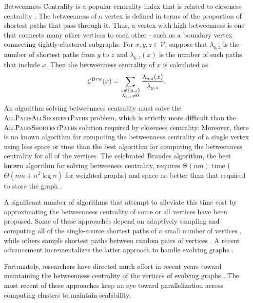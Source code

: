 \documentclass[10]{report}
\newcommand{\algoname}[1]{\textnormal{\textsc{#1}}}
\begin{document}
Betweenness Centrality is a popular centrality index that is related to closeness centrality \cite{freeman1977set}. 
The betweenness of a vertex is defined in terms of the proportion of shortest paths that pass through it.
Thus, a vertex with high betweenness is one that connects many other vertices to each other - such as a boundary vertex connecting tightly-clustered subgraphs.
For $x,y, z \in \mathcal{V}$, suppose that $\lambda_{y,z}$ is the number of shortest paths from $y$ to $z$ and $\lambda_{y,z}(x)$ is the number of such paths that include $x$. 
Then the betweenness centrality of $x$ is calculated as
%
\begin{equation} \label{eq:bc}
\mathcal{C}^{\algoname{Btw}}(x) = \sum\limits_{\substack{x \not\in \{y,z\} \\ \lambda_{y,z} \neq 0}} \frac{\lambda_{y,z}(x)}{\lambda_{y,z}}.
\end{equation}
%
An algorithm solving betweenness centrality must solve the \algoname{AllPairsAllShortestPaths} problem, which is strictly more difficult than the \algoname{AllPairsShortestPaths} solution required by closeness centrality.
Moreover, there is no known algorithm for computing the betweenness centrality of a single vertex using less space or time than the best algorithm for computing the betweenness centrality for all of the vertices. 
The celebrated Brandes algorithm, the best known algorithm for solving betweeness centrality, requires $\Theta(nm)$ time ($\Theta(nm + n^2\log n)$ for weighted graphs) and space no better than that required to store the graph  \cite{brandes2001faster}. 

A significant number of algorithms that attempt to alleviate this time cost by approximating the betweenness centrality of some or all vertices have been proposed. 
Some of these approaches depend on adaptively sampling and computing all of the single-source shortest paths of a small number of vertices \cite{bader2007approximating,brandes2007centrality}, while others sample shortest paths between random pairs of vertices \cite{riondato2016fast}. 
A recent advancement incrementalizes the latter approach to handle evolving graphs \cite{bergamini2014approximating}.

Fortunately, researchers have directed much effort in recent years toward maintaining the betweenness centrality of the vertices of evolving graphs \cite{green2012fast, wei2014real, kourtellis2015scalable}. 
The most recent of these approaches keep an eye toward parallelization across computing clusters to maintain scalability.
\end{document}
